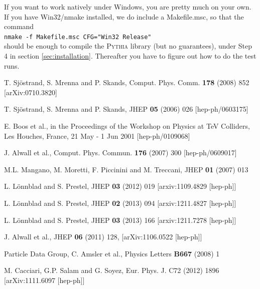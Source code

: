 \documentclass[12pt,a4paper]{article}
\begin{document}
If you want to work natively under Windows, you are pretty much on your
own. If you have Win32/nmake installed, we do include a Makefile.msc,
so that the command\\
\hspace*{10mm}\texttt{nmake -f Makefile.msc CFG="Win32 Release"}\\
should be enough to compile the \textsc{Pythia} library (but no
guarantees), under Step 4 in section \ref{sec:installation}. 
Thereafter you have to figure out how to do the test runs. 

\begin{thebibliography}{99}

T. Sj\"ostrand, S. Mrenna and P. Skands,
Comput. Phys. Comm. {\bf 178} (2008) 852 [arXiv:0710.3820] 

T. Sj\"ostrand, S. Mrenna and P. Skands, 
JHEP {\bf 05} (2006) 026 [hep-ph/0603175]

E. Boos et al., in the Proceedings of the Workshop on Physics at TeV 
Colliders, Les Houches, France, 21 May - 1 Jun 2001 [hep-ph/0109068]

J. Alwall et al., 
Comput. Phys. Commun. {\bf 176} (2007) 300 [hep-ph/0609017]

M.L. Mangano, M. Moretti, F. Piccinini and M. Treccani,
JHEP {\bf 01} (2007) 013

L. L\"{o}nnblad and S. Prestel, JHEP {\bf 03} (2012) 019
[arxiv:1109.4829 [hep-ph]]

L. L\"{o}nnblad and S. Prestel, JHEP {\bf 02} (2013) 094 
[arxiv:1211.4827 [hep-ph]]

L. L\"{o}nnblad and S. Prestel, JHEP {\bf 03} (2013) 166
[arxiv:1211.7278 [hep-ph]]

J. Alwall et al., 
JHEP {\bf 06} (2011) 128, [arXiv:1106.0522 [hep-ph]]

Particle Data Group, C. Amsler et al., 
Physics Letters {\bf B667} (2008) 1

M. Cacciari, G.P. Salam and G. Soyez, Eur. Phys. J. C72 (2012) 1896\\
{}[arXiv:1111.6097 [hep-ph]] 

\end{thebibliography}
\end{document}
